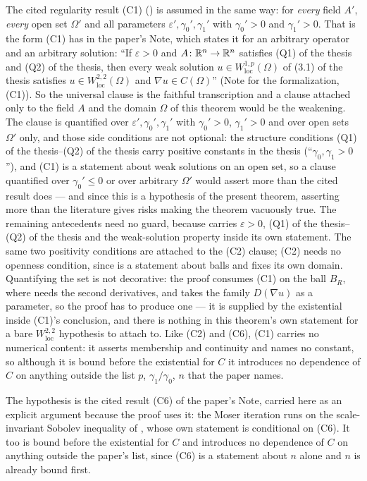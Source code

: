 \begin{theorem}[Theorem 1]
The cited regularity result (C1) () is assumed in
the same way: for \emph{every} field $A'$, \emph{every} open set $\Omega'$ and
all parameters $\varepsilon',\gamma_0',\gamma_1'$ with
$\gamma_0'>0$ and $\gamma_1'>0$.  That is the form (C1) has in the
paper's Note, which states it for an arbitrary operator and an arbitrary
solution: ``If $\varepsilon>0$ and $A\colon\mathbb{R}^n\to\mathbb{R}^n$ satisfies
(Q1) of the thesis and (Q2) of the thesis, then every weak solution
$u\in W^{1,p}_{\mathrm{loc}}(\Omega)$ of (3.1) of the thesis satisfies
$u\in W^{2,2}_{\mathrm{loc}}(\Omega)$ and $\nabla u\in C(\Omega)$'' (Note for the
formalization, (C1)).  So the universal clause is the faithful transcription and
a clause attached only to the field $A$ and the domain $\Omega$ of this theorem
would be the weakening.  The clause is quantified over
$\varepsilon',\gamma_0',\gamma_1'$ with $\gamma_0'>0$, $\gamma_1'>0$ and over
open sets $\Omega'$ only, and those side conditions are not optional: the
structure conditions (Q1) of the thesis--(Q2) of the thesis carry positive constants in
the thesis (``$\gamma_0,\gamma_1>0$''), and (C1) is a statement about weak
solutions on an open set, so a clause quantified over $\gamma_0'\le0$ or over
arbitrary $\Omega'$ would assert more than the cited result does --- and since
this is a hypothesis of the present theorem, asserting more than the literature
gives risks making the theorem vacuously true.  The remaining antecedents need
no guard, because  carries $\varepsilon>0$,
(Q1) of the thesis--(Q2) of the thesis and the weak-solution property inside its own
statement.  The same two positivity conditions are attached to the (C2) clause;
(C2) needs no openness condition, since  is a
statement about balls and fixes its own domain.  Quantifying the set is not decorative: the proof consumes (C1) on
the ball $B_R$, where  needs the second
derivatives, and  takes the family
$D(\nabla u)$ as a parameter, so the proof has to produce one --- it is supplied
by the existential inside (C1)'s conclusion, and there is nothing in this
theorem's own statement for a bare $W^{2,2}_{\mathrm{loc}}$ hypothesis to attach
to.  Like (C2) and (C6), (C1) carries no numerical content: it asserts
membership and continuity and names no constant, so although it is bound before
the existential for $C$ it introduces no dependence of $C$ on anything outside
the list $p$, $\gamma_1/\gamma_0$, $n$ that the paper names.

The hypothesis  is the cited result (C6) of the
paper's Note, carried here as an explicit argument because the proof uses it: the
Moser iteration runs on the scale-invariant Sobolev inequality of
, whose own statement is conditional on (C6).
It too is bound before the existential for $C$ and introduces no dependence of
$C$ on anything outside the paper's list, since (C6) is a statement about $n$
alone and $n$ is already bound first.
\end{theorem}
